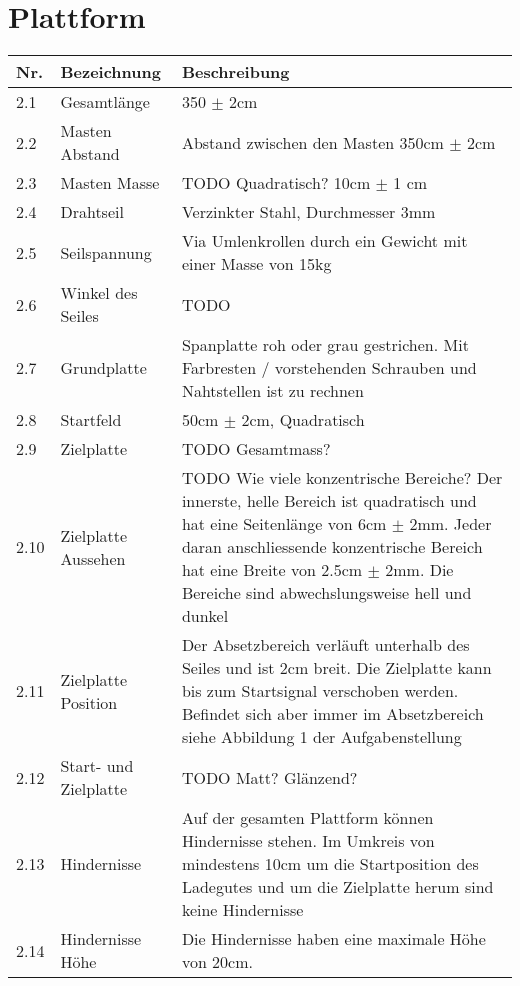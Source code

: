\documentclass[a4paper]{report}
\begin{document}
\section{Plattform}
\begin{tabular}{|l|l|l|}
	\hline 
	\textbf{Nr.} & \textbf{Bezeichnung} & \textbf{Beschreibung} \\
	\hline 
	2.1 & Gesamtlänge & 350 $\pm$ 2cm \\ 
	\hline 
	2.2 & Masten Abstand & Abstand zwischen den Masten 350cm $\pm$ 2cm \\
	\hline
	2.3 & Masten Masse & TODO Quadratisch? 10cm $\pm$ 1 cm \\
	\hline
	2.4 & Drahtseil & Verzinkter Stahl, Durchmesser 3mm \\ 
	\hline 
	2.5 & Seilspannung & Via Umlenkrollen durch ein Gewicht mit einer Masse von 15kg \\ 
	\hline 
	2.6 & Winkel des Seiles & TODO \\
	\hline
	2.7 & Grundplatte & Spanplatte roh oder grau gestrichen. Mit Farbresten / vorstehenden Schrauben und Nahtstellen ist zu rechnen \\
	\hline
	2.8 & Startfeld & 50cm $\pm$ 2cm, Quadratisch \\ 
	\hline 
	2.9 & Zielplatte & TODO Gesamtmass? \\ 
	\hline 
	2.10 & Zielplatte Aussehen & TODO Wie viele konzentrische Bereiche? Der innerste, helle Bereich ist quadratisch und hat eine Seitenlänge von 6cm $\pm$ 2mm. Jeder daran anschliessende konzentrische Bereich hat eine Breite von 2.5cm $\pm$ 2mm. Die Bereiche sind abwechslungsweise hell und dunkel \\ 
	\hline 
	2.11 & Zielplatte Position & Der Absetzbereich verläuft unterhalb des Seiles und ist 2cm breit. Die Zielplatte kann bis zum Startsignal verschoben werden. Befindet sich aber immer im Absetzbereich siehe Abbildung 1 der Aufgabenstellung \\
	\hline
	2.12 & Start- und Zielplatte & TODO Matt? Glänzend? \\
	\hline
	2.13 & Hindernisse & Auf der gesamten Plattform können Hindernisse stehen. Im Umkreis von mindestens 10cm um die Startposition des Ladegutes und um die Zielplatte herum sind keine Hindernisse \\
	\hline
	2.14 & Hindernisse Höhe & Die Hindernisse haben eine maximale Höhe von 20cm. \\
	\hline
\end{tabular} 
\end{document}
